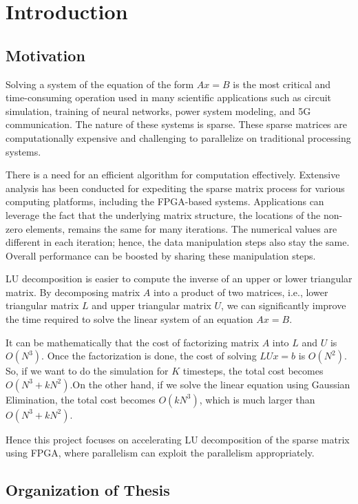 \chapter{Introduction}
\section{Motivation}
Solving a system of the equation of the form $Ax=B$ is the most critical and time-consuming operation used in many scientific applications such as circuit simulation, training of neural networks, power system modeling, and 5G communication. The nature of these systems is sparse. These sparse matrices are computationally expensive and challenging to parallelize on traditional processing systems.

There is a need for an efficient algorithm for computation effectively.  Extensive analysis has been conducted for expediting the sparse matrix process for various computing platforms, including the FPGA-based systems. Applications can leverage the fact that the underlying matrix structure, the locations of the non-zero elements, remains the same for many iterations. The numerical values are different in each iteration; hence, the data manipulation steps also stay the same. Overall performance can be boosted by sharing these manipulation steps.

LU decomposition is easier to compute the inverse of an upper or lower triangular matrix. By decomposing matrix $A$ into a product of two matrices, i.e., lower triangular matrix $L$ and upper triangular matrix $U$, we can significantly improve the time required to solve the linear system of an equation $Ax = B$.

It can be mathematically that the cost of factorizing matrix $A$ into $L$ and $U$ is $O(N^3)$. Once the factorization is done, the cost of solving $LUx = b$ is $O(N^2)$. So, if we want to do the simulation for $K$ timesteps, the total cost becomes $O(N^3 + kN^2)$.On the other hand, if we solve the linear equation using Gaussian Elimination, the total cost becomes $O(kN^3)$, which is much larger than $O(N^3 + kN^2)$.

Hence this project focuses on accelerating LU decomposition of the sparse matrix using FPGA, where parallelism can exploit the parallelism appropriately.

\break
\section{Organization of Thesis}

